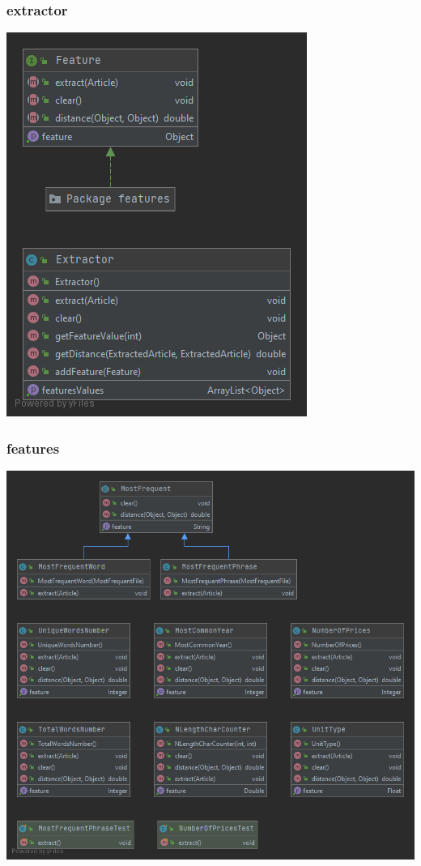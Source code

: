 \documentclass{classrep}
\begin{document}
\subsubsection{extractor}
\includegraphics[scale=0.5]{Package extractor}
\subsubsection{features}
\includegraphics[scale=0.5]{Package features}
\end{document}
